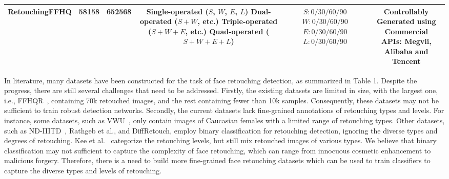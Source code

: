\documentclass[sigconf]{acmart}
\begin{document}
\begin{table}
\begin{center}
\begin{tabular}{c|c|c|c|c|c}
\hline
\hline
\textbf{RetouchingFFHQ} & 58158 & 652568 & \makecell{Single-operated ($S$, $W$, $E$, $L$)\\Dual-operated ($S+W$, etc.)\\Triple-operated ($S+W+E$, etc.)\\Quad-operated ($S+W+E+L$)} & \makecell{$S: 0/30/60/90$\\$W: 0/30/60/90$\\$E: 0/30/60/90$\\$L: 0/30/60/90$} & \makecell{Controllably Generated using Commercial\\APIs: Megvii, Alibaba and Tencent}\\
\hline 
\hline
\end{tabular}
\end{center}
\end{table}

In literature, many datasets have been constructed for the task of face retouching detection, as summarized  in Table 1. 
Despite the progress, there are still several challenges that need to be addressed.
Firstly, the existing datasets are limited in size, with the largest one, i.e., FFHQR~\cite{shafaei2021autoretouch}, containing 70k retouched images, and the rest containing fewer than 10k samples.
Consequently, these datasets may not be sufficient to train robust detection networks.
Secondly, the current datasets lack fine-grained annotations of retouching types and levels.
For instance, some datasets, such as VWU~\cite{VMUYMU}, only contain images of Caucasian females with a limited range of retouching types. 
Other datasets, such as ND-IIITD~\cite{bharati2016detecting}, Rathgeb et al.\cite{rathgeb2019impact}, and DiffRetouch\cite{rathgeb2020differential}, employ binary classification for retouching detection, ignoring the diverse types and degrees of retouching. Kee et al.~\cite{kee2011perceptual} categorize the retouching levels, but still mix retouched images of various types. We believe that binary classification may not sufficient to capture the complexity of face retouching, which can range from innocuous cosmetic enhancement to malicious forgery. Therefore, there is a need to build more fine-grained face retouching datasets which can be used to train classifiers to capture the diverse types and levels of retouching.
\end{document}
